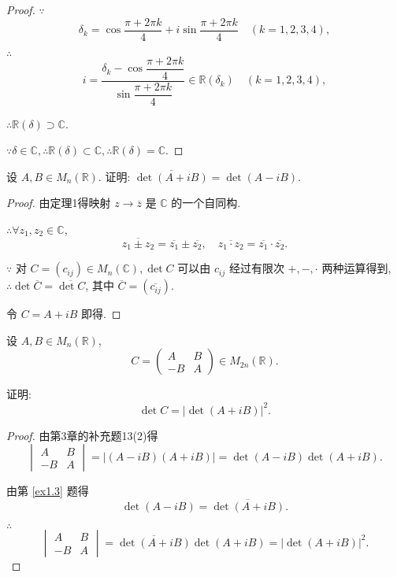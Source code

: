 \documentclass[color=black,device=normal,lang=cn,mode=geye]{elegantnote}
\begin{document}
\begin{proof}
    $\because$
    \[\delta_k=\cos\dfrac{\pi+2\pi k}{4}+i\sin\dfrac{\pi+2\pi k}{4}\quad(k=1,2,3,4),\]

    $\therefore$
    \[i=\dfrac{\delta_k-\cos\dfrac{\pi+2\pi k}{4}}{\sin\dfrac{\pi+2\pi k}{4}}\in\mathbb{R}(\delta_k)\quad(k=1,2,3,4),\]

    $\therefore\mathbb{R}(\delta)\supset\mathbb{C}$.

    $\because\delta\in\mathbb{C},\therefore\mathbb{R}(\delta)\subset\mathbb{C},\therefore\mathbb{R}(\delta)=\mathbb{C}$.
\end{proof}
\begin{exercise}\label{ex1.3}
    设 $A,B\in M_n(\mathbb{R})$. 证明: $\overline{\det(A+iB)}=\det(A-iB)$.
\end{exercise}
\begin{proof}
    由定理1得映射 $z\to\overline{z}$ 是 $\mathbb{C}$ 的一个自同构.

    $\therefore\forall z_1,z_2\in\mathbb{C}$,
    \[\overline{z_1\pm z_2}=\overline{z_1}\pm\overline{z_2},\quad\overline{z_1\cdot z_2}=\overline{z_1}\cdot\overline{z_2}.\]

    $\because$ 对 $C=(c_{ij})\in M_n(\mathbb{C}),\det C$ 可以由 $c_{ij}$ 经过有限次 $+,-,\cdot$ 两种运算得到, $\therefore\det\overline{C}=\overline{\det C}$, 其中 $\overline{C}=(\overline{c_{ij}})$.

    令 $C=A+iB$ 即得.
\end{proof}
\begin{exercise}\label{ex1.4}
    设 $A,B\in M_n(\mathbb{R})$,
    \[C=\begin{pmatrix}
        A & B \\
        -B & A
    \end{pmatrix}\in M_{2n}(\mathbb{R}).\]

    证明:
    \[\det C=|\det(A+iB)|^2.\]
\end{exercise}
\begin{proof}
    由第3章的补充题13(2)得
    \[\begin{vmatrix}
        A & B \\
        -B & A
    \end{vmatrix}=|(A-iB)(A+iB)|=\det(A-iB)\det(A+iB).\]

    由第 \ref{ex1.3} 题得
    \[\det(A-iB)=\overline{\det(A+iB)}.\]

    $\therefore$
    \[\begin{vmatrix}
        A & B \\
        -B & A
    \end{vmatrix}=\overline{\det(A+iB)}\det(A+iB)=|\det(A+iB)|^2.\]
\end{proof}
\end{document}
